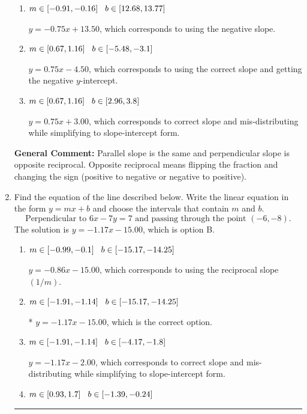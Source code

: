 \documentclass{extbook}[14pt]
\newcommand{\litem}[1]{\item #1

\rule{\textwidth}{0.4pt}}
\begin{document}
\begin{enumerate}
{\begin{enumerate}[label=\Alph*.]
 $y = 1.33x + 4.50$, which corresponds to using the reciprocal slope $(1/m)$.
\item \( m \in [-0.91, -0.16] \hspace*{3mm} b \in [12.68, 13.77] \)

 $y = -0.75x + 13.50$, which corresponds to using the negative slope.
\item \( m \in [0.67, 1.16] \hspace*{3mm} b \in [-5.48, -3.1] \)

 $y = 0.75x - 4.50$, which corresponds to using the correct slope and getting the negative $y$-intercept.
\item \( m \in [0.67, 1.16] \hspace*{3mm} b \in [2.96, 3.8] \)

 $y = 0.75x + 3.00$, which corresponds to correct slope and mis-distributing while simplifying to slope-intercept form.
\end{enumerate}

\textbf{General Comment:} Parallel slope is the same and perpendicular slope is opposite reciprocal. Opposite reciprocal means flipping the fraction and changing the sign (positive to negative or negative to positive).
}
\litem{
Find the equation of the line described below. Write the linear equation in the form $ y=mx+b $ and choose the intervals that contain $m$ and $b$.
\[ \text{Perpendicular to } 6 x - 7 y = 7 \text{ and passing through the point } (-6, -8). \]The solution is \( y = -1.17x - 15.00 \), which is option B.\begin{enumerate}[label=\Alph*.]
\item \( m \in [-0.99, -0.1] \hspace*{3mm} b \in [-15.17, -14.25] \)

 $y = -0.86x - 15.00$, which corresponds to using the reciprocal slope $(1/m)$.
\item \( m \in [-1.91, -1.14] \hspace*{3mm} b \in [-15.17, -14.25] \)

* $y = -1.17x - 15.00$, which is the correct option.
\item \( m \in [-1.91, -1.14] \hspace*{3mm} b \in [-4.17, -1.8] \)

 $y = -1.17x - 2.00$, which corresponds to correct slope and mis-distributing while simplifying to slope-intercept form.
\item \( m \in [0.93, 1.7] \hspace*{3mm} b \in [-1.39, -0.24] \)


\end{enumerate}}
\end{enumerate}
\end{document}
